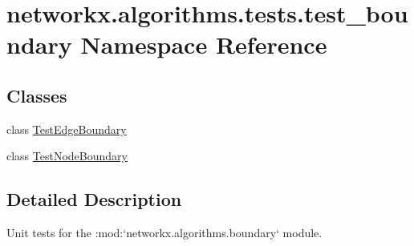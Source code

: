 \hypertarget{namespacenetworkx_1_1algorithms_1_1tests_1_1test__boundary}{}\section{networkx.\+algorithms.\+tests.\+test\+\_\+boundary Namespace Reference}
\label{namespacenetworkx_1_1algorithms_1_1tests_1_1test__boundary}
\subsection*{Classes}
\begin{DoxyCompactItemize}
\item 
class \hyperlink{classnetworkx_1_1algorithms_1_1tests_1_1test__boundary_1_1TestEdgeBoundary}{Test\+Edge\+Boundary}
\item 
class \hyperlink{classnetworkx_1_1algorithms_1_1tests_1_1test__boundary_1_1TestNodeBoundary}{Test\+Node\+Boundary}
\end{DoxyCompactItemize}


\subsection{Detailed Description}
\begin{DoxyVerb}Unit tests for the :mod:`networkx.algorithms.boundary` module.\end{DoxyVerb}
 